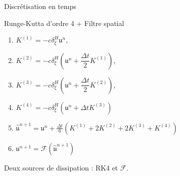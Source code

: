 \documentclass[11pt]{beamer}
\begin{document}
\begin{frame}{Discrétisation en temps}
\begin{block}{Runge-Kutta d'ordre 4 + Filtre spatial}
\begin{enumerate}
\item $K^{(1)} = - c \delta_{\xi}^H \mathfrak{u}^n$,
\item $K^{(2)} = - c \delta_{\xi}^H \left( \mathfrak{u}^n + \dfrac{\Delta t}{2} K^{(1)} \right)$,
\item $K^{(3)} = - c \delta_{\xi}^H \left( \mathfrak{u}^n + \dfrac{\Delta t}{2} K^{(2)} \right)$,
\item $K^{(4)} = - c \delta_{\xi}^H \left( \mathfrak{u}^n + \Delta t K^{(3)} \right)$
\item $\hat{\mathfrak{u}}^{n+1} = \mathfrak{u}^n + \frac{\Delta t}{6} \left( K^{(1)} + 2 K^{(2)} + 2 K^{(3)} + K^{(4)} \right)$
\item $\mathfrak{u}^{n+1} = \mathcal{F}(\hat{\mathfrak{u}}^{n+1})$
\end{enumerate}
\end{block}

\begin{block}{}
Deux sources de dissipation : RK4 et $\mathcal{F}$.
\end{block}

\end{frame}
\end{document}

